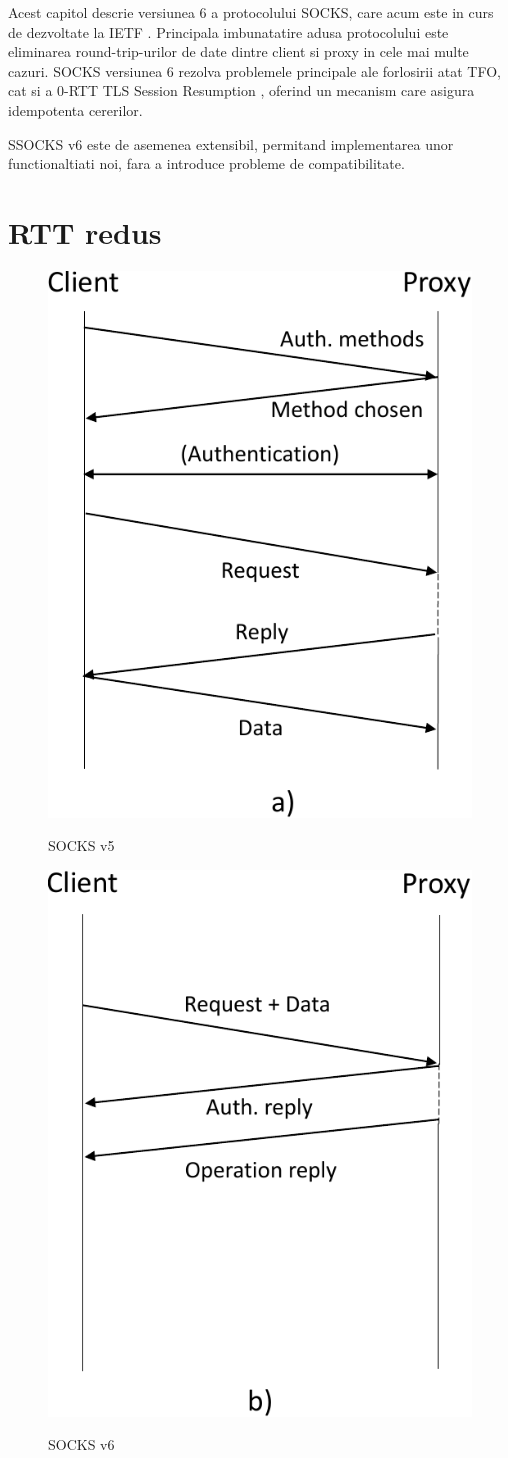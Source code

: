 Acest capitol descrie versiunea 6 a protocolului SOCKS, care acum este in curs de dezvoltate la IETF \cite{olteanu-intarea-socks-6-02}.
Principala imbunatatire adusa protocolului este eliminarea round-trip-urilor de date dintre client si proxy in cele mai multe cazuri.
SOCKS versiunea 6 rezolva problemele principale ale forlosirii atat TFO, cat si a 0-RTT TLS Session Resumption \cite{tls1.3},
oferind un mecanism care asigura idempotenta cererilor.

SSOCKS v6 este de asemenea extensibil, permitand implementarea unor functionaltiati noi, fara a introduce probleme de compatibilitate.

\section{RTT redus}


\begin{figure}[t]
	\centering
	\includegraphics*[angle=0,height=.50\textwidth]{figures/socks/a-crop}
	\label{fig:socksv5}
	\caption{SOCKS v5}
\end{figure}

\begin{figure}[t]
	\centering
	\includegraphics*[angle=0,height=.50\textwidth]{figures/socks/b-crop}
	\label{fig:socksv6short}
	\caption{SOCKS v6}
\end{figure}

